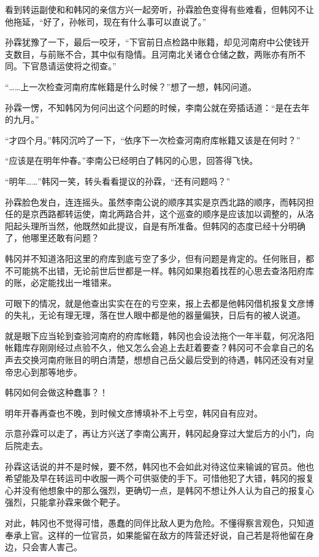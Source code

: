 看到转运副使和和韩冈的亲信方兴一起旁听，孙霖脸色变得有些难看，但韩冈不让他拖延，“好了，孙帐司，现在有什么事可以直说了。”

孙霖犹豫了一下，最后一咬牙，“下官前日点检路中账籍，却见河南府中公使钱开支数目，与前账不合，其中似有隐情。且河南北关诸仓仓储之数，两账亦有所不同。下官恳请运使将之彻查。”

“……上一次检查河南府库帐籍是什么时候？”想了一想，韩冈问道。

孙霖一愣，不知韩冈为何问出这个问题的时候，李南公就在旁插话道：“是在去年的九月。”

“才四个月。”韩冈沉吟了一下，“依序下一次检查河南府库帐籍又该是在何时？”

“应该是在明年仲春。”李南公已经明白了韩冈的心思，回答得飞快。

“明年……”韩冈一笑，转头看看提议的孙霖，“还有问题吗？”

孙霖脸色发白，连连摇头。虽然李南公说的顺序其实是京西北路的顺序，而韩冈担任的是京西路都转运使，南北两路合并，这个巡查的顺序是应该加以调整的，从洛阳起头理所当然，他既然如此提议，自是有所准备。但韩冈的态度已经十分明确了，他哪里还敢有问题？

韩冈并不知道洛阳这里的府库到底亏空了多少，但有问题是肯定的。任何账目，都不可能挑不出错，无论前世后世都是一样。韩冈如果抱着找茬的心思去查洛阳府库的账，必定能找出一堆错来。

可眼下的情况，就是他查出实实在在的亏空来，报上去都是他韩冈借机报复文彦博的失礼，无论有理无理，落在世人眼中都是他的器量偏狭，日后有的被人说道。

就是眼下应当轮到查验河南府的府库帐籍，韩冈也会设法拖个一年半载，何况洛阳帐籍库存刚刚经过点验不久，他又怎么会追上去赶着要查？韩冈可不会拿自己的名声去交换河南府账目的明白清楚，想想自己岳父最后受到的待遇，韩冈还没有对皇帝忠心到那等地步。

韩冈如何会做这种蠢事？！

明年开春再查也不晚，到时候文彦博填补不上亏空，韩冈自有应对。

示意孙霖可以走了，再让方兴送了李南公离开，韩冈起身穿过大堂后方的小门，向后院走去。

孙霖这话说的并不是时候，要不然，韩冈也不会如此对待这位来输诚的官员。他也希望能及早在转运司中收服一两个可供驱使的手下。可惜他犯了大错，韩冈的报复心并没有他想象中的那么强烈，更确切一点，是韩冈不想让外人认为自己的报复心强烈，只能拿孙霖来做个靶子。

对此，韩冈也不觉得可惜，愚蠢的同伴比敌人更为危险。不懂得察言观色，只知道奉承上官。这样的一位官员，如果能留在敌方的阵营还好说，自己若是将他留在身边，只会害人害己。

